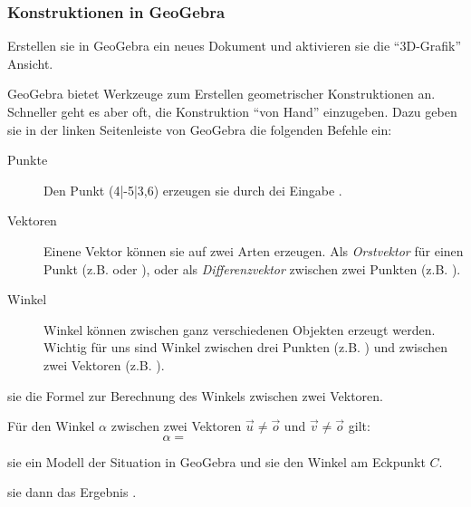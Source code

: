 \documentclass[10pt, a4paper]{scrartcl}
\begin{document}
\begin{center}
\begin{minipage}{.9\textwidth}\begin{rahmen}\small
\subsubsection*{Konstruktionen in GeoGebra}
Erstellen sie in GeoGebra ein neues Dokument und aktivieren sie die \enquote{3D-Grafik} Ansicht.

GeoGebra bietet Werkzeuge zum Erstellen geometrischer Konstruktionen an. Schneller geht es aber oft,
die Konstruktion \enquote{von Hand} einzugeben. Dazu geben sie in der linken Seitenleiste von GeoGebra die folgenden Befehle ein:
\begin{description}
	\item[Punkte] Den Punkt \pkt[A](4|-5|3,6) erzeugen sie durch dei Eingabe .
	\item[Vektoren] Einene Vektor können sie auf zwei Arten erzeugen. Als \emph{Orstvektor} für einen Punkt (z.B.  oder ), oder als \emph{Differenzvektor} zwischen zwei Punkten (z.B. ).
	\item[Winkel] Winkel können zwischen ganz verschiedenen Objekten erzeugt werden. Wichtig für uns 
	sind Winkel zwischen drei Punkten (z.B. ) und zwischen zwei Vektoren (z.B. ).
\end{description}
\end{rahmen}\end{minipage}
\end{center}

\begin{aufgabe}
	 sie die Formel zur Berechnung des Winkels zwischen zwei Vektoren.
	\medskip
	\begin{infobox}
		Für den Winkel $\alpha$ zwischen zwei Vektoren $\vec{u}\neq\vec{o}$ und 
			$\vec{v}\neq\vec{o}$ gilt:
			\[ \alpha = \hspace{4cm} \]
	\end{infobox}
\end{aufgabe}

\vspace{1cm}
\begin{aufgabe}[subtitle={Buch S.196, Afg.3}]
	 sie ein Modell der Situation in GeoGebra und  sie den Winkel am Eckpunkt $C$. 
	
	
	 sie dann das Ergebnis . 
\end{aufgabe}
\end{document}
